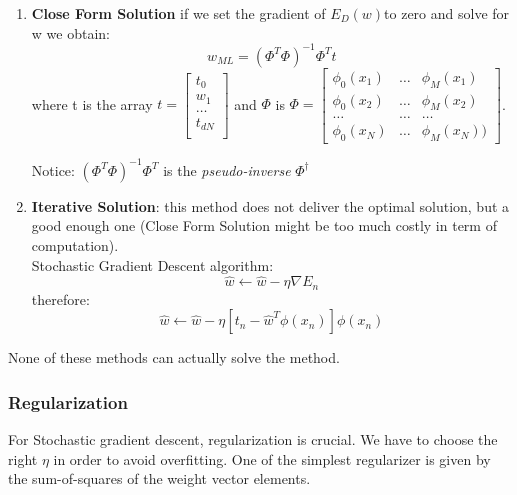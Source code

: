 \begin{enumerate}
    \item \textbf{Close Form Solution} 
        if we set the gradient of $E_{D}(w)$to zero and solve for w we obtain:
        \begin{equation}
            w_{ML} = (\Phi^{T}\Phi)^{-1}\Phi^{T}t
        \end{equation}
        where t is the array $t = \begin{bmatrix} t_{0}\\ w_{1} \\ \dots \\ t_{dN} \\ \end{bmatrix}$ and $\Phi$ is
        $\Phi = \begin{bmatrix} \phi_{0}(x_{1}) & \dots & \phi_{M}(x_{1}) \\ \phi_{0}(x_{2}) & \dots & \phi_{M}(x_{2}) \\ \dots & \dots & \dots \\ \phi_{0}(x_{N}) & \dots & \phi_{M}(x_{N})) \end{bmatrix}$.

        Notice: $(\Phi^{T}\Phi)^{-1}\Phi^{T}$ is the \textit{pseudo-inverse} $\Phi^{\dagger}$
    \item \textbf{Iterative Solution}: this method does not deliver the optimal solution, but a good enough one (Close Form Solution might be too much costly in term of computation). \\
    Stochastic Gradient Descent algorithm:
    \begin{equation}
        \hat{w} \xleftarrow{} \hat{w} - \eta\nabla E_{n}
    \end{equation}
    therefore:
    \begin{equation}
        \hat{w} \xleftarrow{} \hat{w} - \eta[t_{n} - \hat{w}^{T}\phi(x_{n})]\phi(x_{n})
    \end{equation}
\end{enumerate}

None of these methods can actually solve the method.

\subsubsection{Regularization}
For Stochastic gradient descent, regularization is crucial. We have to choose the right $\eta$ in order to avoid overfitting.
One of the simplest regularizer is given by the sum-of-squares of the weight vector elements. 

